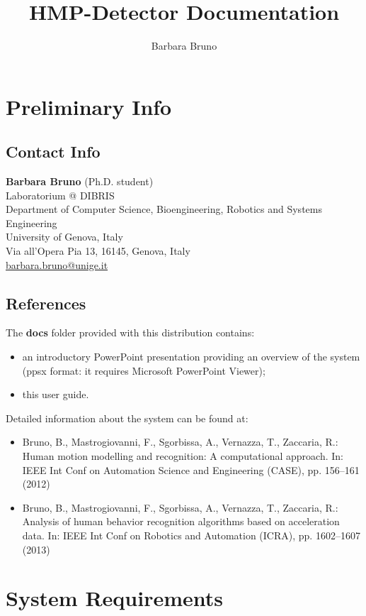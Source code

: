 \documentclass[10pt,a4paper]{report}
\author{Barbara Bruno}
\title{HMP-Detector Documentation}
\begin{document}
\maketitle

\tableofcontents

\chapter{Preliminary Info}
\section{Contact Info}

\textbf{Barbara Bruno} (Ph.D. student)\\
Laboratorium @ DIBRIS\\
Department of Computer Science, Bioengineering, Robotics and Systems Engineering\\
University of Genova, Italy\\
Via all'Opera Pia 13, 16145, Genova, Italy\\
\url{barbara.bruno@unige.it}

\section{References}

The \textbf{docs} folder provided with this distribution contains:
\begin{itemize}
\item an introductory PowerPoint presentation providing an overview of the system (ppsx format: it requires Microsoft PowerPoint Viewer);
\item this user guide.
\end{itemize}
Detailed information about the system can be found at:
\begin{itemize}
\item Bruno, B., Mastrogiovanni, F., Sgorbissa, A., Vernazza, T., Zaccaria, R.: Human motion modelling and recognition: A computational approach. In: IEEE Int Conf on Automation Science and Engineering (CASE), pp. 156--161 (2012)
\item Bruno, B., Mastrogiovanni, F., Sgorbissa, A., Vernazza, T., Zaccaria, R.: Analysis of human behavior recognition algorithms based on acceleration data. In: IEEE Int Conf on Robotics and Automation (ICRA), pp. 1602--1607 (2013)
\end{itemize}

\chapter{System Requirements}
\end{document}
